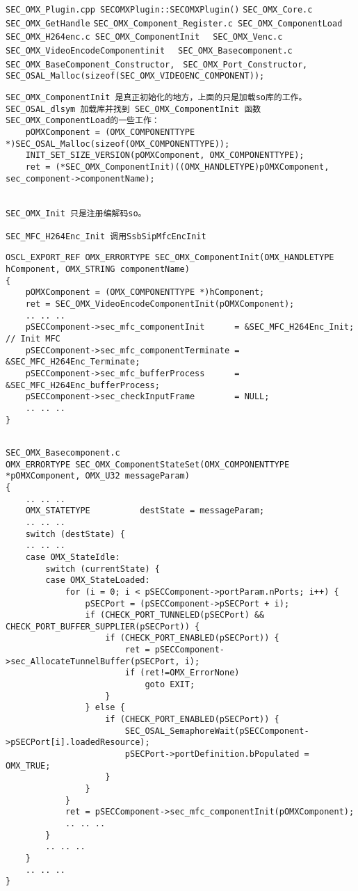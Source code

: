 \documentclass[a4paper,10pt,twoside]{article}%
\begin{document}
\begin{flushleft}
\verb|SEC_OMX_Plugin.cpp SECOMXPlugin::SECOMXPlugin()|
\invoke{10pt}\verb|SEC_OMX_Core.c SEC_OMX_GetHandle|
\invoke{20pt}\verb|SEC_OMX_Component_Register.c SEC_OMX_ComponentLoad|
\invoke{30pt}\verb| SEC_OMX_H264enc.c SEC_OMX_ComponentInit |
\invoke{40pt}\verb| SEC_OMX_Venc.c SEC_OMX_VideoEncodeComponentinit |
\invoke{50pt}\verb| SEC_OMX_Basecomponent.c SEC_OMX_BaseComponent_Constructor,|
             \verb| SEC_OMX_Port_Constructor,|
             \verb| SEC_OSAL_Malloc(sizeof(SEC_OMX_VIDEOENC_COMPONENT));|
\end{flushleft}
\begin{verbatim}
SEC_OMX_ComponentInit 是真正初始化的地方，上面的只是加载so库的工作。
SEC_OSAL_dlsym 加载库并找到 SEC_OMX_ComponentInit 函数
SEC_OMX_ComponentLoad的一些工作：
    pOMXComponent = (OMX_COMPONENTTYPE *)SEC_OSAL_Malloc(sizeof(OMX_COMPONENTTYPE));
    INIT_SET_SIZE_VERSION(pOMXComponent, OMX_COMPONENTTYPE);
    ret = (*SEC_OMX_ComponentInit)((OMX_HANDLETYPE)pOMXComponent, sec_component->componentName);


SEC_OMX_Init 只是注册编解码so。

SEC_MFC_H264Enc_Init 调用SsbSipMfcEncInit
\end{verbatim}

\begin{lstlisting}
OSCL_EXPORT_REF OMX_ERRORTYPE SEC_OMX_ComponentInit(OMX_HANDLETYPE hComponent, OMX_STRING componentName)
{
    pOMXComponent = (OMX_COMPONENTTYPE *)hComponent;
    ret = SEC_OMX_VideoEncodeComponentInit(pOMXComponent);
    .. .. ..
    pSECComponent->sec_mfc_componentInit      = &SEC_MFC_H264Enc_Init; // Init MFC
    pSECComponent->sec_mfc_componentTerminate = &SEC_MFC_H264Enc_Terminate;
    pSECComponent->sec_mfc_bufferProcess      = &SEC_MFC_H264Enc_bufferProcess;
    pSECComponent->sec_checkInputFrame        = NULL;
    .. .. ..
}
\end{lstlisting}
\begin{lstlisting}

SEC_OMX_Basecomponent.c
OMX_ERRORTYPE SEC_OMX_ComponentStateSet(OMX_COMPONENTTYPE *pOMXComponent, OMX_U32 messageParam)
{
    .. .. ..
    OMX_STATETYPE          destState = messageParam;
    .. .. .. 
    switch (destState) {
    .. .. .. 
    case OMX_StateIdle:
        switch (currentState) {
        case OMX_StateLoaded:
            for (i = 0; i < pSECComponent->portParam.nPorts; i++) {
                pSECPort = (pSECComponent->pSECPort + i);
                if (CHECK_PORT_TUNNELED(pSECPort) && CHECK_PORT_BUFFER_SUPPLIER(pSECPort)) {
                    if (CHECK_PORT_ENABLED(pSECPort)) {
                        ret = pSECComponent->sec_AllocateTunnelBuffer(pSECPort, i);
                        if (ret!=OMX_ErrorNone)
                            goto EXIT;
                    }
                } else {
                    if (CHECK_PORT_ENABLED(pSECPort)) {
                        SEC_OSAL_SemaphoreWait(pSECComponent->pSECPort[i].loadedResource);
                        pSECPort->portDefinition.bPopulated = OMX_TRUE;
                    }
                }
            }
            ret = pSECComponent->sec_mfc_componentInit(pOMXComponent);
            .. .. ..
        }
        .. .. ..
    }
    .. .. ..
}
\end{lstlisting}
\end{document}
